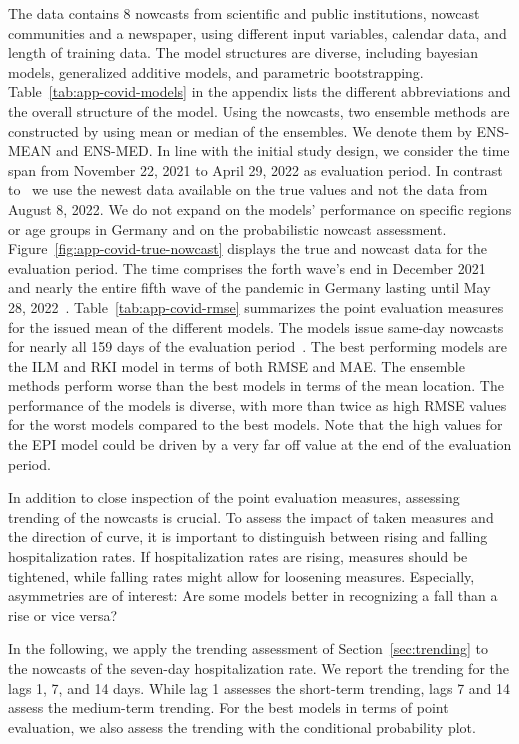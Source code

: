 The data contains 8 nowcasts from scientific and public institutions, nowcast communities and a newspaper, using different input variables, calendar data, and length of training data.
The model structures are diverse, including bayesian models, generalized additive models, and parametric bootstrapping.
Table~\ref{tab:app-covid-models} in the appendix lists the different abbreviations and the overall structure of the model.
Using the nowcasts, two ensemble methods are constructed by using mean or median of the ensembles.
We denote them by ENS-MEAN and ENS-MED.
In line with the initial study design, we consider the time span from November 22, 2021 to April 29, 2022 as evaluation period.
In contrast to~\textcite{Wolffram2023} we use the newest data available on the true values and not the data from August 8, 2022.
We do not expand on the models' performance on specific regions or age groups in Germany and on the probabilistic nowcast assessment.
Figure~\ref{fig:app-covid-true-nowcast} displays the true and nowcast data for the evaluation period.
The time comprises the forth wave's end in December 2021 and nearly the entire fifth wave of the pandemic in Germany lasting until May 28, 2022~\parencite{Tolksdorf2022}.
Table~\ref{tab:app-covid-rmse} summarizes the point evaluation measures for the issued mean of the different models.
The models issue same-day nowcasts for nearly all 159 days of the evaluation period~\parencite[see][Tables A2, A3, and A4]{Wolffram2023}.
The best performing models are the ILM and RKI model in terms of both RMSE and MAE.
The ensemble methods perform worse than the best models in terms of the mean location.
The performance of the models is diverse, with more than twice as high RMSE values for the worst models compared to the best models.
Note that the high values for the EPI model could be driven by a very far off value at the end of the evaluation period.

In addition to close inspection of the point evaluation measures, assessing trending of the nowcasts is crucial.
To assess the impact of taken measures and the direction of curve, it is important to distinguish between rising and falling hospitalization rates.
If hospitalization rates are rising, measures should be tightened, while falling rates might allow for loosening measures.
Especially, asymmetries are of interest: Are some models better in recognizing a fall than a rise or vice versa?

In the following, we apply the trending assessment of Section~\ref{sec:trending} to the nowcasts of the seven-day hospitalization rate.
We report the trending for the lags 1, 7, and 14 days.
While lag 1 assesses the short-term trending, lags 7 and 14 assess the medium-term trending.
For the best models in terms of point evaluation, we also assess the trending with the conditional probability plot.

